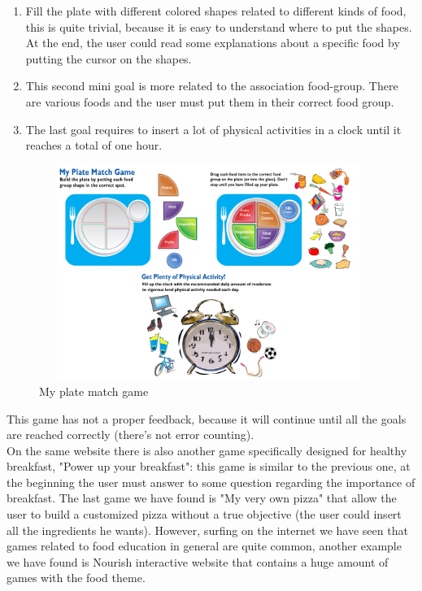 \begin{enumerate}
\item Fill the plate with different colored shapes related to different kinds of food, this is quite trivial, because it is easy to understand where to put the shapes. At the end, the user could read some explanations about a specific food by putting the cursor on the shapes.
\item This second mini goal is more related to the association food-group. There are various foods and the user must put them in their correct food group.
\item The last goal requires to insert a lot of physical activities in a clock until it reaches a total of one hour. 
\end{enumerate}
\begin{figure}[H]
\centering
\includegraphics[width=11cm, height=7cm]{immagini/myplate.png}
\caption{My plate match game}\label{fig:myplate}
\end{figure}
This game has not a proper feedback, because it will continue until all the goals are reached correctly (there's not error counting).\\
On the same website there is also another game specifically designed for healthy breakfast, "Power up your breakfast": this game is similar to the previous one, at the beginning the user must answer to some question regarding the importance of breakfast.
The last game we have found is "My very own pizza" that allow the user to build a customized pizza without a true objective (the user could insert all the ingredients he wants).
However, surfing on the internet we have seen that games related to food education in general are quite common, another example we have found is Nourish interactive website \cite{Nourish} that contains a huge amount of games with the food theme.
